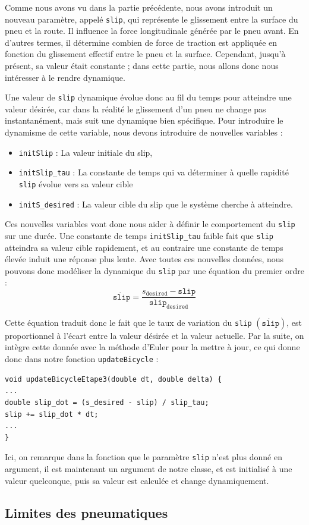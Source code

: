 Comme nous avons vu dans la partie précédente, nous avons introduit un nouveau paramètre, appelé \texttt{slip}, qui représente le glissement entre la surface du pneu et la route. Il influence la force longitudinale générée par le pneu avant. En d'autres termes, il détermine combien de force de traction est appliquée en fonction du glissement effectif entre le pneu et la surface. Cependant, jusqu'à présent, sa valeur était constante ; dans cette partie, nous allons donc nous intéresser à le rendre dynamique.

Une valeur de \texttt{slip} dynamique évolue donc au fil du temps pour atteindre une valeur désirée, car dans la réalité le glissement d'un pneu ne change pas instantanément, mais suit une dynamique bien spécifique. Pour introduire le dynamisme de cette variable, nous devons introduire de nouvelles variables :

\begin{itemize}
\item \texttt{initSlip} : La valeur initiale du slip,

\item \texttt{initSlip\_tau} : La constante de temps qui va déterminer à quelle rapidité \texttt{slip} évolue vers sa valeur cible

\item \texttt{initS\_desired} : La valeur cible du slip que le système cherche à atteindre.

\end{itemize}

Ces nouvelles variables vont donc nous aider à définir le comportement du \texttt{slip} sur une durée. Une constante de temps \texttt{initSlip\_tau} faible fait que \texttt{slip} atteindra sa valeur cible rapidement, et au contraire une constante de temps élevée induit une réponse plus lente. Avec toutes ces nouvelles données, nous pouvons donc modéliser la dynamique du \texttt{slip} par une équation du premier ordre :
$$\dot{\texttt{slip}} = \frac{s_{\texttt{desired}} - \texttt{slip}}{\texttt{slip}_{\texttt{desired}}}$$

Cette équation traduit donc le fait que le taux de variation du \texttt{slip} $(\dot{\texttt{slip}})$, est proportionnel à l'écart entre la valeur désirée et la valeur actuelle. Par la suite, on intègre cette donnée avec la méthode d'Euler pour la mettre à jour, ce qui donne donc dans notre fonction \texttt{updateBicycle} :

\begin{lstlisting}[style=CStyle]
void updateBicycleEtape3(double dt, double delta) {
...
double slip_dot = (s_desired - slip) / slip_tau;
slip += slip_dot * dt;
...
}
\end{lstlisting}

Ici, on remarque dans la fonction que le paramètre \texttt{slip} n'est plus donné en argument, il est maintenant un argument de notre classe, et est initialisé à une valeur quelconque, puis sa valeur est calculée et change dynamiquement.

\subsection{Limites des pneumatiques}

